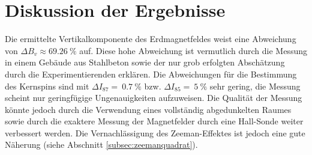 \section{Diskussion der Ergebnisse}
\label{sec:Diskussion}
Die ermittelte Vertikalkomponente des Erdmagnetfeldes weist eine Abweichung von $\Delta B_{v} \approx \SI{69.26}{\percent}$
auf. Diese hohe Abweichung ist vermutlich durch die Messung in einem Gebäude aus Stahlbeton sowie der nur grob
erfolgten Abschätzung durch die Experimentierenden erklären. Die Abweichungen für die Bestimmung des Kernspins
sind mit $\Delta I_{87} =\  \SI{0.7}{\percent}$ bzw. $ \Delta I_{85} =\  \SI{5}{\percent}$ sehr gering, die Messung scheint
nur geringfügige Ungenauigkeiten aufzuweisen. Die Qualität der Messung könnte jedoch durch die Verwendung eines
vollständig abgedunkelten Raumes sowie durch die exaktere Messung der Magnetfelder durch eine Hall-Sonde weiter
verbessert werden. Die Vernachlässigung des Zeeman-Effektes ist jedoch eine gute Näherung (siehe Abschnitt \ref{subsec:zeemanquadrat}).
